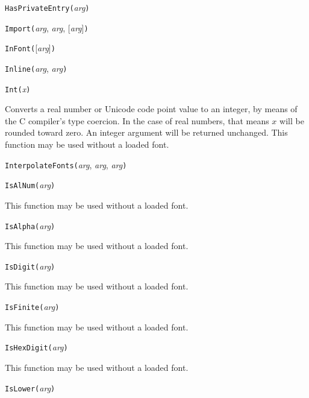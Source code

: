 
\noindent\texttt{HasPrivateEntry(}\textit{arg}\texttt{)}


\noindent\texttt{Import(}\textit{arg}, \textit{arg}, [\textit{arg}]\texttt{)}


\noindent\texttt{InFont(}[\textit{arg}]\texttt{)}


\noindent\texttt{Inline(}\textit{arg}, \textit{arg}\texttt{)}


\noindent\texttt{Int(}\textit{x}\texttt{)}

Converts a real number or Unicode code point value to an integer, by means
of the C compiler's type coercion.  In the case of real numbers, that means
$x$ will be rounded toward zero.  An integer argument will be returned
unchanged.
This function may be used without a loaded font.


\noindent\texttt{InterpolateFonts(}\textit{arg}, \textit{arg}, \textit{arg}\texttt{)}


\noindent\texttt{IsAlNum(}\textit{arg}\texttt{)}

This function may be used without a loaded font.


\noindent\texttt{IsAlpha(}\textit{arg}\texttt{)}

This function may be used without a loaded font.


\noindent\texttt{IsDigit(}\textit{arg}\texttt{)}

This function may be used without a loaded font.


\noindent\texttt{IsFinite(}\textit{arg}\texttt{)}

This function may be used without a loaded font.


\noindent\texttt{IsHexDigit(}\textit{arg}\texttt{)}

This function may be used without a loaded font.


\noindent\texttt{IsLower(}\textit{arg}\texttt{)}

